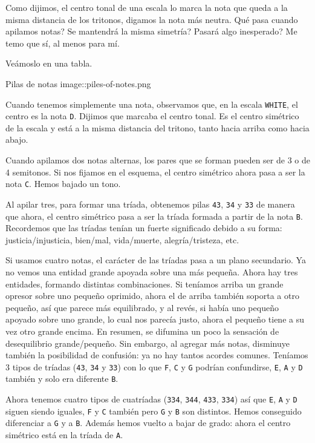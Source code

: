 \documentclass[]{article}
\begin{document}
Como dijimos, el centro tonal de una escala lo marca la nota que queda a la misma distancia de los tritonos, digamos la nota más neutra. Qué pasa cuando apilamos notas? Se mantendrá la misma simetría? Pasará algo inesperado? Me temo que sí, al menos para mí.

Veámoslo en una tabla.

Pilas de notas image::piles-of-notes.png

Cuando tenemos simplemente una nota, observamos que, en la escala \texttt{WHITE}, el centro es la nota \texttt{D}. Dijimos que marcaba el centro tonal. Es el centro simétrico de la escala y está a la misma distancia del tritono, tanto hacia arriba como hacia abajo.

Cuando apilamos dos notas alternas, los pares que se forman pueden ser de 3 o de 4 semitonos. Si nos fijamos en el esquema, el centro simétrico ahora pasa a ser la nota \texttt{C}. Hemos bajado un tono.

Al apilar tres, para formar una tríada, obtenemos pilas \texttt{43}, \texttt{34} y \texttt{33} de manera que ahora, el centro simétrico pasa a ser la tríada formada a partir de la nota \texttt{B}. Recordemos que las tríadas tenían un fuerte significado debido a su forma: justicia/injusticia, bien/mal, vida/muerte, alegría/tristeza, etc.

Si usamos cuatro notas, el carácter de las tríadas pasa a un plano secundario. Ya no vemos una entidad grande apoyada sobre una más pequeña. Ahora hay tres entidades, formando distintas combinaciones. Si teníamos arriba un grande opresor sobre uno pequeño oprimido, ahora el de arriba también soporta a otro pequeño, así que parece más equilibrado, y al revés, si había uno pequeño apoyado sobre uno grande, lo cual nos parecía justo, ahora el pequeño tiene a su vez otro grande encima. En resumen, se difumina un poco la sensación de desequilibrio grande/pequeño. Sin embargo, al agregar más notas, disminuye también la posibilidad de confusión: ya no hay tantos acordes comunes. Teníamos 3 tipos de tríadas (\texttt{43}, \texttt{34} y \texttt{33}) con lo que \texttt{F}, \texttt{C} y \texttt{G} podrían confundirse, \texttt{E}, \texttt{A} y \texttt{D} también y solo era diferente \texttt{B}.

Ahora tenemos cuatro tipos de cuatríadas (\texttt{334}, \texttt{344}, \texttt{433}, \texttt{334}) así que \texttt{E}, \texttt{A} y \texttt{D} siguen siendo iguales, \texttt{F} y \texttt{C} también pero \texttt{G} y \texttt{B} son distintos. Hemos conseguido diferenciar a \texttt{G} y a \texttt{B}. Además hemos vuelto a bajar de grado: ahora el centro simétrico está en la tríada de \texttt{A}.
\end{document}
